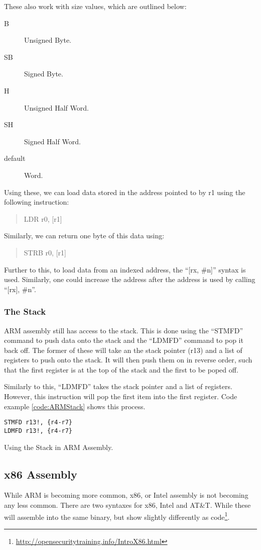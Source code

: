 				These also work with size values, which are outlined below:
				\begin{description}
					\item[B] Unsigned Byte. 
					\item[SB] Signed Byte. 
					\item[H] Unsigned Half Word.
					\item[SH] Signed Half Word.
					\item[default] Word. 
				\end{description}
				Using these, we can load data stored in the address pointed to by r1 using the following instruction:
				\begin{quote}
					LDR r0, [r1]
				\end{quote}
				Similarly, we can return one byte of this data using:
				\begin{quote}
					STRB r0, [r1]
				\end{quote}

				Further to this, to load data from an indexed address, the ``[rx, \#n]'' syntax is used. 
				Similarly, one could increase the address after the address is used by calling ``[rx], \#n''. 

			\subsubsection{The Stack}
				ARM assembly still has access to the stack. 
				This is done using the ``STMFD'' command to push data onto the stack and the ``LDMFD'' command to pop it back off. 
				The former of these will take an the stack pointer (r13) and a list of registers to push onto the stack. 
				It will then push them on in reverse order, such that the first register is at the top of the stack and the first to be poped off. 

				Similarly to this, ``LDMFD'' takes the stack pointer and a list of registers. 
				However, this instruction will pop the first item into the first register. 
				Code example \ref{code:ARMStack} shows this process. 

				\begin{code}
					\begin{lstlisting}[language={[ARM]Assembler}]
STMFD r13!, {r4-r7}
LDMFD r13!, {r4-r7}
					\end{lstlisting}
					\caption{Using the Stack in ARM Assembly.}
					\label{code:ARMStack}
				\end{code}

		\subsection{x86 Assembly}
			While ARM is becoming more common, x86, or Intel assembly is not becoming any less common. 
			There are two syntaxes for x86, Intel and AT\&T. 
			While these will assemble into the same binary, but show slightly differently as code\footnote{\url{http://opensecuritytraining.info/IntroX86.html}}. 

